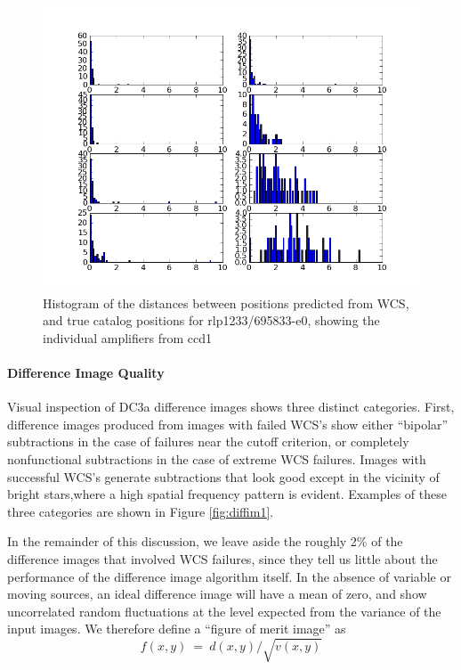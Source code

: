 \begin{figure}[htb]
\begin{center}
\includegraphics[width=6in]{images/rlp1233_ccd1_match.png}
\caption{Histogram of the distances between positions predicted from WCS, and
  true catalog positions for rlp1233/695833-e0, showing the individual
amplifiers from ccd1}  
\label{fig:wcs2}
\end{center}
\end{figure}




\paragraph{Difference Image Quality}

Visual inspection of DC3a difference images shows three distinct
categories. First, difference images produced from images with failed 
WCS's show either ``bipolar'' subtractions in the case of failures
near the cutoff criterion, or completely nonfunctional subtractions in
the case of extreme WCS failures.  Images with successful WCS's
generate subtractions that look good except in the vicinity of bright
stars,where a high spatial frequency pattern is evident.  Examples of
these three categories are shown in Figure \ref{fig:diffim1}.

In the remainder of this discussion, we leave aside the roughly 2\% of
the difference images that involved WCS failures, since they tell us
little about the performance of the difference image algorithm itself.
In the absence of variable or moving sources, an ideal difference
image will have a mean of zero, and show uncorrelated random
fluctuations at the level expected from the variance of the input
images.  We therefore define a ``figure of merit image'' as
\begin{equation}
f(x,y)~=~d(x,y)/\sqrt {v(x,y)}
\end{equation} 


